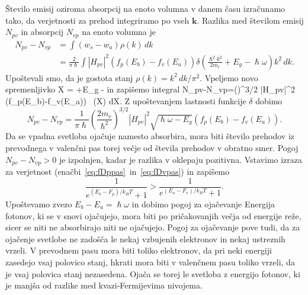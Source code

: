 Število emisij oziroma absorpcij na enoto volumna v danem času izračunamo tako,
da verjetnosti za prehod integriramo po vseh $\mathbf{k}$. Razlika med številom 
emisij $N_{pv}$ in absorpcij $N_{vp}$ na enoto volumna je
\begin{align}  
N_{pv}-N_{vp}&=\int\left(w_s-w_a\right)\rho(k)\,dk  \nonumber \\
&=\frac{2}{\pi\hslash} \int |H_{pv}|^2\left(f_p(E_b)-f_v(E_a)\right)
\delta \left(\frac{\hslash^2 k^2}{2m_r}+E_g -\hslash\omega\right) k^2\,dk.
\label{6.7}
\end{align}
Upoštevali smo, da je gostota stanj $\rho(k)=k^2\, dk/\pi^2$. Vpeljemo
novo spremenljivko 
\beq
X = +E_g -\hslash\omega
\eeq
in zapišemo integral
\beq
N_{pv}-N_{vp}=\left(\right)^{3/2}\!
\int |H_{pv}|^2 \left(f_p(E_b)-f_v(E_a)\right)
\,
\delta (X) dX.
\label{6.7a}
\eeq
Z upoštevanjem lastnosti funkcije $\delta$ dobimo
\begin{equation}  
N_{pv}-N_{vp}=\frac{1}{\pi\hslash}\left(\frac{2m_r}{\hslash^2}\right)^{3/2}
|H_{pv}|^2 \sqrt{\hslash \omega-E_g}\left(f_p(E_b)-f_v(E_a)\right)\!.
\label{6.11}
\end{equation}
Da se vpadna svetloba ojačuje namesto absorbira, mora biti število prehodov
iz prevodnega v valenčni pas torej večje od števila prehodov v obratno smer. Pogoj
$N_{pv}-N_{vp} >0$ je izpolnjen, kadar je razlika v oklepaju pozitivna. Vstavimo izraza
za verjetnost (enačbi~\ref{eq:fDppas}~in~\ref{eq:fDvpas}) in zapišemo
\begin{equation}  
\frac{1}{e^{(E_b-F_{p})/k_B T}+1}>\frac{1}{e^{(E_a-F_v)/k_B T}+1}.
\label{6.12}
\end{equation}
Upoštevamo zvezo $E_b-E_a = \hslash \omega$ in dobimo pogoj za ojačevanje
Energija fotonov, ki se v snovi ojačujejo, mora biti po pričakovanjih večja od
energije reže, sicer se niti ne absorbirajo niti ne ojačujejo. Pogoj za ojačevanje pove tudi, 
da za ojačenje svetlobe ne zadošča le nekaj vzbujenih elektronov in nekaj ustreznih vrzeli. 
V prevodnem pasu mora biti toliko elektronov, da pri neki energiji zasedejo vsaj polovico stanj, 
hkrati  mora biti v valenčnem pasu toliko vrzeli, da je vsaj polovica stanj nezasedena.
Ojača se torej le svetloba z energijo fotonov, ki je manjša od razlike med kvazi-Fermijevima
nivojema. 

